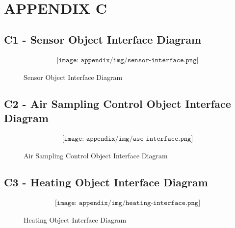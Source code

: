 \section{APPENDIX C} \label{sec:appC}
\subsection*{C1 - Sensor Object Interface Diagram} %
\begin{figure}[H]
    \begin{align*}
        \texttt{[image: appendix/img/sensor-interface.png]}
    \end{align*}
    \caption{Sensor Object Interface Diagram}
    \label{fig:C1}
\end{figure}


\subsection*{C2 - Air Sampling Control Object Interface Diagram} %
\begin{figure}[H]
    \begin{align*}
        \texttt{[image: appendix/img/asc-interface.png]}
    \end{align*}
    \caption{Air Sampling Control Object Interface Diagram}
    \label{fig:C2}
\end{figure}


\subsection*{C3 - Heating Object Interface Diagram} %
\begin{figure}[H]
    \begin{align*}
        \texttt{[image: appendix/img/heating-interface.png]}
    \end{align*}
    \caption{Heating Object Interface Diagram}
    \label{fig:C3}
\end{figure}